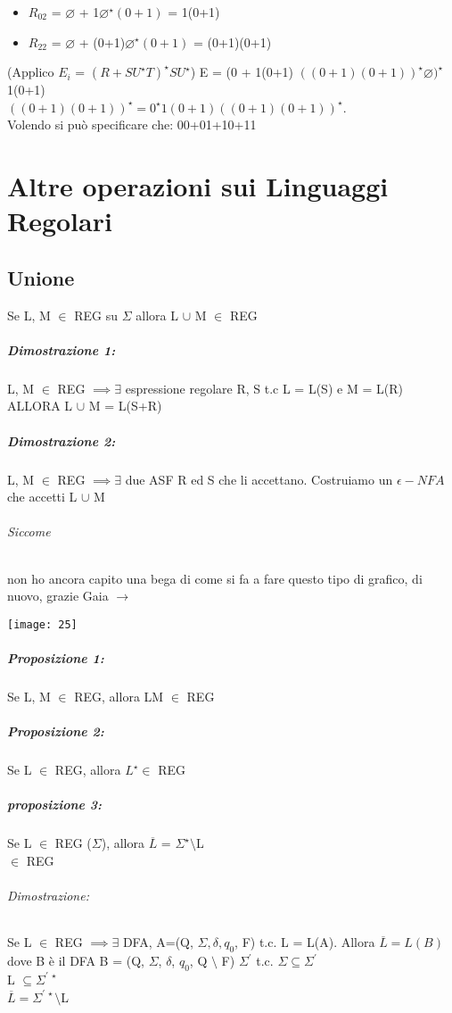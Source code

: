 \documentclass[12pt, a4paper, openany, oneside]{book}
\begin{document}
\begin{itemize}
	\item $R_{02}$ = $\varnothing$ + 1$\varnothing^{\star}(0+1)$ = 1(0+1)
	\item $R_{22}$ = $\varnothing$ + (0+1)$\varnothing^{\star}(0+1)$ = (0+1)(0+1)
\end{itemize}
(Applico $E_{i}$ = $(R+SU^{\star}T)^{\star}SU^{\star}$)
E = (0 + 1(0+1) $((0+1)(0+1))^{\star}\varnothing)^{\star}$ 1(0+1) \\
$((0+1)(0+1))^{\star} = 0^{\star}1(0+1)((0+1)(0+1))^{\star}$. \\
Volendo si può specificare che: 00+01+10+11
\chapter{Altre operazioni sui Linguaggi Regolari}
\section{Unione}
Se L, M $\in$ REG su $\Sigma$ allora L $\cup$ M $\in$ REG
\paragraph{Dimostrazione 1: }
L, M $\in$ REG $\implies \exists$ espressione regolare R, S t.c L = L(S) e M = L(R)
ALLORA L $\cup$ M = L(S+R)
\paragraph{Dimostrazione 2: }
L, M $\in$ REG $\implies \exists$ due ASF R ed S che li accettano. Costruiamo un
$\epsilon - NFA$ che accetti L $\cup$ M
\subparagraph{Siccome} non ho ancora capito una bega di come si fa a fare questo
tipo di grafico, di nuovo, grazie Gaia $\to$
\begin{center}
\texttt{[image: 25]}
\end{center}	
\paragraph{Proposizione 1: }Se L, M $\in$ REG, allora LM $\in$ REG 
\paragraph{Proposizione 2: }Se L $\in$ REG, allora $L^{\star} \in$ REG
\paragraph{proposizione 3: }Se L $\in$ REG ($\Sigma$), allora $\overline{L}$
= $\Sigma^{\star}\setminus$L \\
$\in$ REG 
\subparagraph{Dimostrazione: }Se L $\in$ REG $\implies \exists$ DFA, 
A=(Q, $\Sigma, \delta, q_{0}$, F) t.c. L = L(A). Allora $\overline{L} = L(B)$ dove
B è il DFA B = (Q, $\Sigma$, $\delta$, $q_{0}$, Q $\setminus$ F) 	
$\Sigma^{'}$ t.c. $\Sigma \subseteq \Sigma^{'}$\\
L $\subseteq \Sigma^{'~\star}$\\
$\overline{L} = \Sigma^{'~\star} \setminus $L\\
\end{document}
